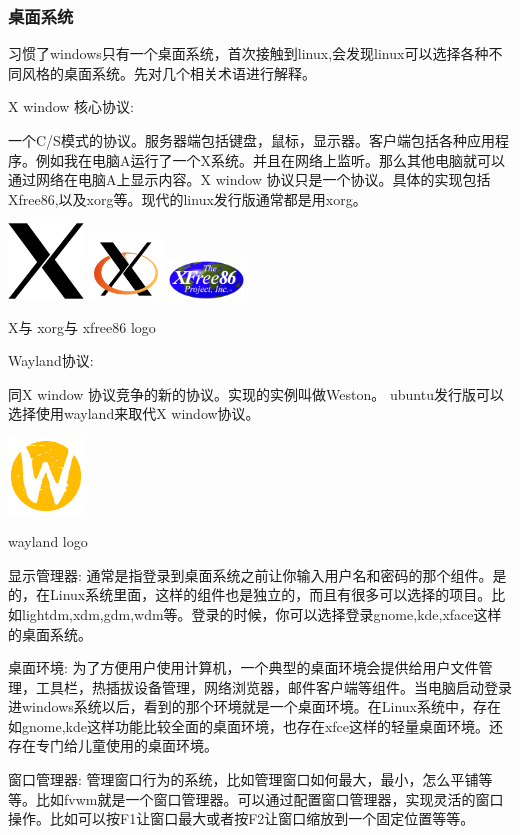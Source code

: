 \documentclass[UTF8]{ctexart}
\begin{document}
\subsubsection{\msyh 桌面系统}
习惯了windows只有一个桌面系统，首次接触到linux,会发现linux可以选择各种不同风格的桌面系统。先对几个相关术语进行解释。
\par
{\msyh X window 核心协议:}
\par
一个C/S模式的协议。服务器端包括键盘，鼠标，显示器。客户端包括各种应用程序。例如我在电脑A运行了一个X系统。并且在网络上监听。那么其他电脑就可以通过网络在电脑A上显示内容。X window 协议只是一个协议。具体的实现包括Xfree86,以及xorg等。现代的linux发行版通常都是用xorg。
\begin{center}
\includegraphics[width=0.15\textwidth]{x11.png}
\includegraphics[width=0.15\textwidth]{xorg.png}
\includegraphics[width=0.15\textwidth]{xfree86.png}
\par
X与             xorg与              xfree86 logo
\end{center}
\par
{\msyh Wayland协议:}
\par
同X window 协议竞争的新的协议。实现的实例叫做Weston。 ubuntu发行版可以选择使用wayland来取代X window协议。
\begin{center}
\includegraphics[width=0.15\textwidth]{wayland.png}
\par
wayland logo
\end{center}
\par
{\msyh 显示管理器:}
通常是指登录到桌面系统之前让你输入用户名和密码的那个组件。是的，在Linux系统里面，这样的组件也是独立的，而且有很多可以选择的项目。比如lightdm,xdm,gdm,wdm等。登录的时候，你可以选择登录gnome,kde,xface这样的桌面系统。
\par
{\msyh 桌面环境:}
为了方便用户使用计算机，一个典型的桌面环境会提供给用户文件管理，工具栏，热插拔设备管理，网络浏览器，邮件客户端等组件。当电脑启动登录进windows系统以后，看到的那个环境就是一个桌面环境。在Linux系统中，存在如gnome,kde这样功能比较全面的桌面环境，也存在xfce这样的轻量桌面环境。还存在专门给儿童使用的桌面环境。
\par
{\msyh 窗口管理器:}
管理窗口行为的系统，比如管理窗口如何最大，最小，怎么平铺等等。比如fvwm就是一个窗口管理器。可以通过配置窗口管理器，实现灵活的窗口操作。比如可以按F1让窗口最大或者按F2让窗口缩放到一个固定位置等等。
\end{document}
